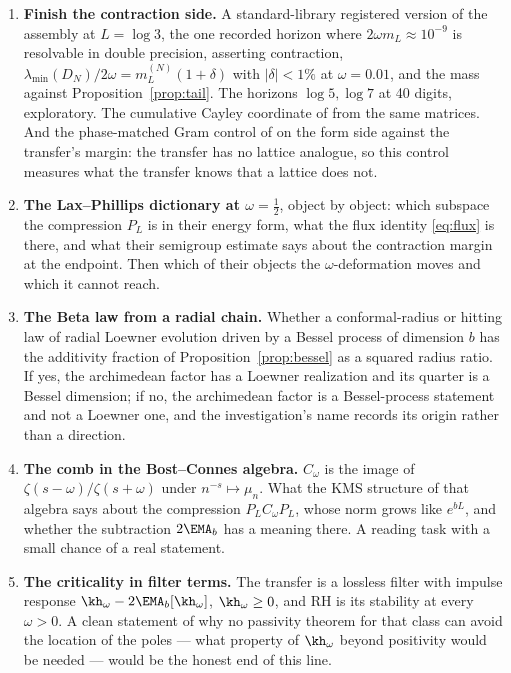 \begin{enumerate}
\item \textbf{Finish the contraction side.} A standard-library registered
version of the assembly at $L=\log3$, the one recorded horizon where
$2\omega m_L\approx10^{-9}$ is resolvable in double precision, asserting
contraction, $\lambda_{\min}(D_N)/2\omega=m_L^{(N)}(1+\delta)$ with $|\delta|<1\%$
at $\omega=0.01$, and the mass against Proposition~\ref{prop:tail}. The
horizons $\log5,\log7$ at 40 digits, exploratory. The cumulative Cayley
coordinate of \cite[Proposition~7.7]{WilsonLines} from the same matrices. And
the phase-matched Gram control of \cite{WilsonReview} on the form side against
the transfer's margin: the transfer has no lattice analogue, so this control
measures what the transfer knows that a lattice does not.
\item \textbf{The Lax--Phillips dictionary at $\omega=\frac12$}, object by
object: which subspace the compression $P_L$ is in their energy form, what the
flux identity \eqref{eq:flux} is there, and what their semigroup estimate says
about the contraction margin at the endpoint. Then which of their objects the
$\omega$-deformation moves and which it cannot reach.
\item \textbf{The Beta law from a radial chain.} Whether a conformal-radius or
hitting law of radial Loewner evolution driven by a Bessel process of dimension
$b$ has the additivity fraction of Proposition~\ref{prop:bessel} as a squared
radius ratio. If yes, the archimedean factor has a Loewner realization and its
quarter is a Bessel dimension; if no, the archimedean factor is a
Bessel-process statement and not a Loewner one, and the investigation's name
records its origin rather than a direction.
\item \textbf{The comb in the Bost--Connes algebra.} $C_\omega$ is the image of
$\zeta(s-\omega)/\zeta(s+\omega)$ under $n^{-s}\mapsto\mu_n$. What the KMS
structure of that algebra says about the compression $P_LC_\omega P_L$, whose
norm grows like $e^{bL}$, and whether the subtraction $2\EMA_b$ has a meaning
there. A reading task with a small chance of a real statement.
\item \textbf{The criticality in filter terms.} The transfer is a lossless
filter with impulse response $\kh_\omega-2\EMA_b[\kh_\omega]$, $\kh_\omega\geq0$,
and RH is its stability at every $\omega>0$. A clean statement of why no
passivity theorem for that class can avoid the location of the poles --- what
property of $\kh_\omega$ beyond positivity would be needed --- would be the
honest end of this line.
\end{enumerate}


